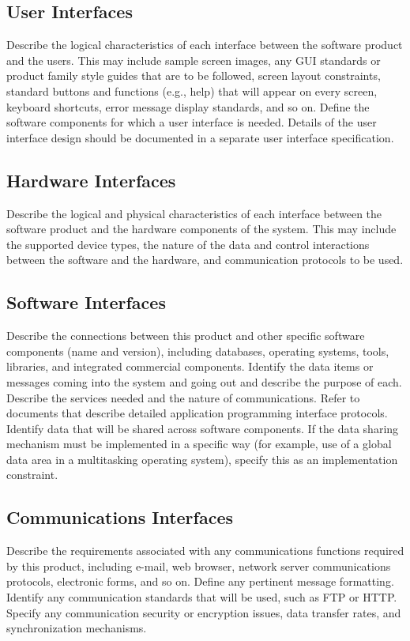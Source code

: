 \subsection*{User Interfaces}
Describe the logical characteristics of each interface between the software product and the users. This may include sample screen images, any GUI standards or product family style guides that are to be followed, screen layout constraints, standard buttons and functions (e.g., help) that will appear on every screen, keyboard shortcuts, error message display standards, and so on. Define the software components for which a user interface is needed. Details of the user interface design should be documented in a separate user interface specification.

\subsection*{Hardware Interfaces}
Describe the logical and physical characteristics of each interface between the software product and the hardware components of the system. This may include the supported device types, the nature of the data and control interactions between the software and the hardware, and communication protocols to be used.

\subsection*{Software Interfaces}
Describe the connections between this product and other specific software components (name and version), including databases, operating systems, tools, libraries, and integrated commercial components. Identify the data items or messages coming into the system and going out and describe the purpose of each. Describe the services needed and the nature of communications. Refer to documents that describe detailed application programming interface protocols. Identify data that will be shared across software components. If the data sharing mechanism must be implemented in a specific way (for example, use of a global data area in a multitasking operating system), specify this as an implementation constraint.

\subsection*{Communications Interfaces}
Describe the requirements associated with any communications functions required by this product, including e-mail, web browser, network server communications protocols, electronic forms, and so on. Define any pertinent message formatting. Identify any communication standards that will be used, such as FTP or HTTP. Specify any communication security or encryption issues, data transfer rates, and synchronization mechanisms.

